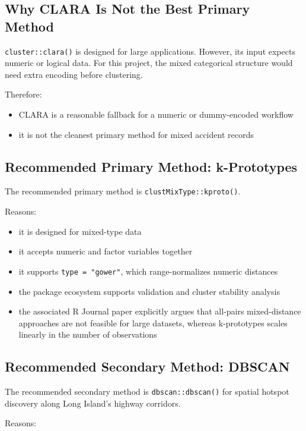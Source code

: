 \documentclass[11pt]{article}
\begin{document}
\subsection{Why CLARA Is Not the Best Primary Method}

\texttt{cluster::clara()} is designed for large applications. However, its input expects numeric or logical data. For this project, the mixed categorical structure would need extra encoding before clustering.

Therefore:

\begin{itemize}
\item CLARA is a reasonable fallback for a numeric or dummy-encoded workflow
\item it is not the cleanest primary method for mixed accident records
\end{itemize}

\subsection{Recommended Primary Method: k-Prototypes}

The recommended primary method is \texttt{clustMixType::kproto()}.

Reasons:

\begin{itemize}
\item it is designed for mixed-type data
\item it accepts numeric and factor variables together
\item it supports \texttt{type = "gower"}, which range-normalizes numeric distances
\item the package ecosystem supports validation and cluster stability analysis
\item the associated R Journal paper explicitly argues that all-pairs mixed-distance approaches are not feasible for large datasets, whereas k-prototypes scales linearly in the number of observations
\end{itemize}

\subsection{Recommended Secondary Method: DBSCAN}

The recommended secondary method is \texttt{dbscan::dbscan()} for spatial hotspot discovery along Long Island's highway corridors.

Reasons:
\end{document}
